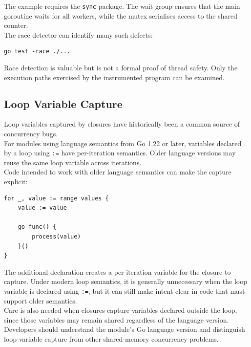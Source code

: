 The example requires the \texttt{sync} package. The wait group ensures that the main goroutine waits for all workers, while the mutex serialises access to the shared counter.\\

The race detector can identify many such defects:

\begin{lstlisting}
go test -race ./...
\end{lstlisting}

Race detection is valuable but is not a formal proof of thread safety. Only the execution paths exercised by the instrumented program can be examined.

\subsection{Loop Variable Capture}

Loop variables captured by closures have historically been a common source of concurrency bugs.\\

For modules using language semantics from Go 1.22 or later, variables declared by a loop using \texttt{:=} have per-iteration semantics. Older language versions may reuse the same loop variable across iterations.\\

Code intended to work with older language semantics can make the capture explicit:

\begin{lstlisting}
for _, value := range values {
    value := value

    go func() {
        process(value)
    }()
}
\end{lstlisting}

The additional declaration creates a per-iteration variable for the closure to capture. Under modern loop semantics, it is generally unnecessary when the loop variable is declared using \texttt{:=}, but it can still make intent clear in code that must support older semantics.\\

Care is also needed when closures capture variables declared outside the loop, since those variables may remain shared regardless of the language version.\\

Developers should understand the module's Go language version and distinguish loop-variable capture from other shared-memory concurrency problems.\\

